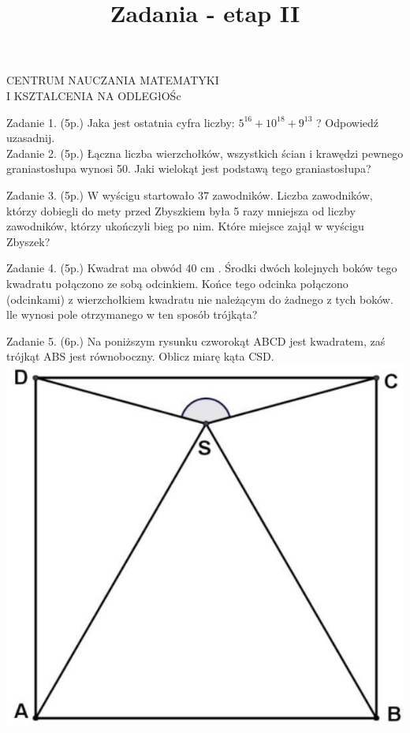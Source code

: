 \documentclass[10pt]{article}
\title{Zadania - etap II }
\author{}
\date{}
\begin{document}
\maketitle
CENTRUM NAUCZANIA MATEMATYKI\\
I KSZTALCENIA NA ODLEGłOŚc

Zadanie 1. (5p.) Jaka jest ostatnia cyfra liczby: \(5^{16}+10^{18}+9^{13}\) ? Odpowiedź uzasadnij.\\
Zadanie 2. (5p.) Łączna liczba wierzchołków, wszystkich ścian i krawędzi pewnego graniastosłupa wynosi 50. Jaki wielokąt jest podstawą tego graniastosłupa?

Zadanie 3. (5p.) W wyścigu startowało 37 zawodników. Liczba zawodników, którzy dobiegli do mety przed Zbyszkiem była 5 razy mniejsza od liczby zawodników, którzy ukończyli bieg po nim. Które miejsce zajął w wyścigu Zbyszek?

Zadanie 4. (5p.) Kwadrat ma obwód 40 cm . Środki dwóch kolejnych boków tego kwadratu połączono ze sobą odcinkiem. Końce tego odcinka połączono (odcinkami) z wierzchołkiem kwadratu nie należącym do żadnego z tych boków. lle wynosi pole otrzymanego w ten sposób trójkąta?

Zadanie 5. (6p.) Na poniższym rysunku czworokąt ABCD jest kwadratem, zaś trójkąt ABS jest równoboczny. Oblicz miarę kąta CSD.\\
\includegraphics[max width=\textwidth, center]{2024_11_21_0810e0f7cfc837eac19bg-1}
\end{document}
